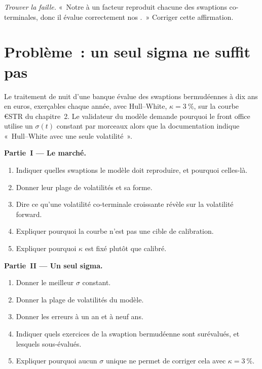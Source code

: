 \begin{exercise}[$\star\star\star$]\label{exo:rc:short-rate-models:8}
\emph{Trouver la faille.} «~Notre  à un facteur reproduit chacune des
swaptions co-terminales, donc il évalue correctement nos .~» Corriger cette affirmation.
\end{exercise}

\section{Problème~: un seul sigma ne suffit pas}

\begin{problem}\label{pb:rc:short-rate-models:1}
Le traitement de nuit d'une banque évalue des swaptions bermudéennes à dix ans en euros, exerçables
chaque année, avec Hull--White, $\kappa=3~\%$, sur la courbe €STR du chapitre~2. Le validateur du modèle
demande pourquoi le front office utilise un $\sigma(t)$ constant par morceaux alors que la documentation indique
«~Hull--White avec une seule volatilité~».

\medskip\noindent\textbf{Partie~I --- Le marché.}
\begin{enumerate}
\item Indiquer quelles swaptions le modèle doit reproduire, et pourquoi celles-là.
\item Donner leur plage de volatilités et sa forme.
\item Dire ce qu'une volatilité co-terminale croissante révèle sur la volatilité forward.
\item Expliquer pourquoi la courbe n'est pas une cible de calibration.
\item Expliquer pourquoi $\kappa$ est fixé plutôt que calibré.
\end{enumerate}

\medskip\noindent\textbf{Partie~II --- Un seul sigma.}
\begin{enumerate}[resume]
\item Donner le meilleur $\sigma$ constant.
\item Donner la plage de volatilités du modèle.
\item Donner les erreurs à un an et à neuf ans.
\item Indiquer quels exercices de la swaption bermudéenne sont surévalués, et lesquels sous-évalués.
\item Expliquer pourquoi aucun $\sigma$ unique ne permet de corriger cela avec $\kappa=3~\%$.
\end{enumerate}


\end{problem}
